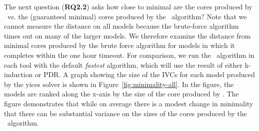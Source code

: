 





The next question (\textbf{RQ2.2}) asks how close to minimal are the cores produced by \ucalg\ vs. the (guaranteed minimal) cores produced by the \ucbfalg\ algorithm?  Note that we cannot measure the distance on all models because the brute-force algorithm times out on many of the larger models.  We therefore examine the distance from minimal cores produced by the brute force algorithm for models in which it completes within the one hour timeout.  For comparison, we run the \ucalg\ algorithm in each tool with the default {\em fastest} algorithm, which will use the result of either k-induction or PDR.  A graph showing the size of the IVCs for each model produced by the yices solver is shown in Figure~\ref{fig:minimality-all}.  In the figure, the models are ranked along the x-axis by the size of the core produced by \ucbfalg.  The figure demonstrates that while on average there is a modest change in minimality that there can be substantial variance on the sizes of the cores produced by the \ucalg\ algorithm.



